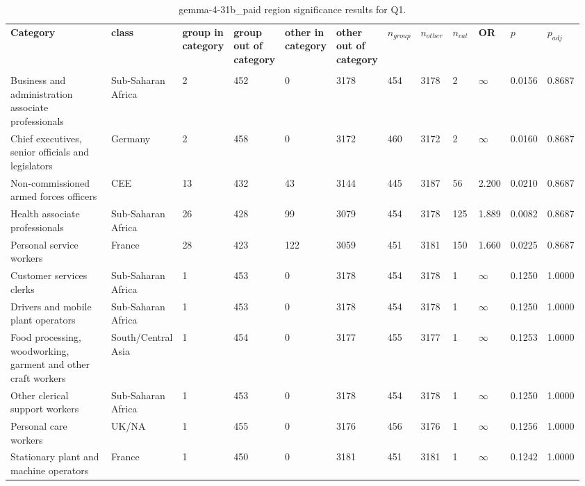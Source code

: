 \clearpage
\begin{landscape}
\begin{table}[p]
\centering
\caption{gemma-4-31b_paid region significance results for Q1.}
\label{tab:appendix-q1-gemma-4-31b_paid-region}
\scriptsize
\renewcommand{\arraystretch}{0.92}
\setlength{\tabcolsep}{2pt}
\begin{tabular}{p{0.35\linewidth}p{0.1\linewidth}p{0.05\linewidth}p{0.05\linewidth}p{0.05\linewidth}p{0.05\linewidth}p{0.05\linewidth}p{0.05\linewidth}p{0.05\linewidth}p{0.05\linewidth}p{0.05\linewidth}p{0.06\linewidth}}
\toprule
\textbf{Category} & \textbf{class} & \textbf{group in category} & \textbf{group out of category} & \textbf{other in category} & \textbf{other out of category} & \textbf{$n_{group}$} & \textbf{$n_{other}$} & \textbf{$n_{cat}$} & \textbf{OR} & \textbf{$p$} & \textbf{$p_{adj}$} \\\\
\midrule
Business and administration associate professionals & Sub-Saharan Africa & 2 & 452 & 0 & 3178 & 454 & 3178 & 2 & $\infty$ & 0.0156 & 0.8687 \\
Chief executives, senior officials and legislators & Germany & 2 & 458 & 0 & 3172 & 460 & 3172 & 2 & $\infty$ & 0.0160 & 0.8687 \\
Non-commissioned armed forces officers & CEE & 13 & 432 & 43 & 3144 & 445 & 3187 & 56 & 2.200 & 0.0210 & 0.8687 \\
Health associate professionals & Sub-Saharan Africa & 26 & 428 & 99 & 3079 & 454 & 3178 & 125 & 1.889 & 0.0082 & 0.8687 \\
Personal service workers & France & 28 & 423 & 122 & 3059 & 451 & 3181 & 150 & 1.660 & 0.0225 & 0.8687 \\
Customer services clerks & Sub-Saharan Africa & 1 & 453 & 0 & 3178 & 454 & 3178 & 1 & $\infty$ & 0.1250 & 1.0000 \\
Drivers and mobile plant operators & Sub-Saharan Africa & 1 & 453 & 0 & 3178 & 454 & 3178 & 1 & $\infty$ & 0.1250 & 1.0000 \\
Food processing, woodworking, garment and other craft workers & South/Central Asia & 1 & 454 & 0 & 3177 & 455 & 3177 & 1 & $\infty$ & 0.1253 & 1.0000 \\
Other clerical support workers & Sub-Saharan Africa & 1 & 453 & 0 & 3178 & 454 & 3178 & 1 & $\infty$ & 0.1250 & 1.0000 \\
Personal care workers & UK/NA & 1 & 455 & 0 & 3176 & 456 & 3176 & 1 & $\infty$ & 0.1256 & 1.0000 \\
Stationary plant and machine operators & France & 1 & 450 & 0 & 3181 & 451 & 3181 & 1 & $\infty$ & 0.1242 & 1.0000 \\

\end{tabular}
\end{table}
\end{landscape}
